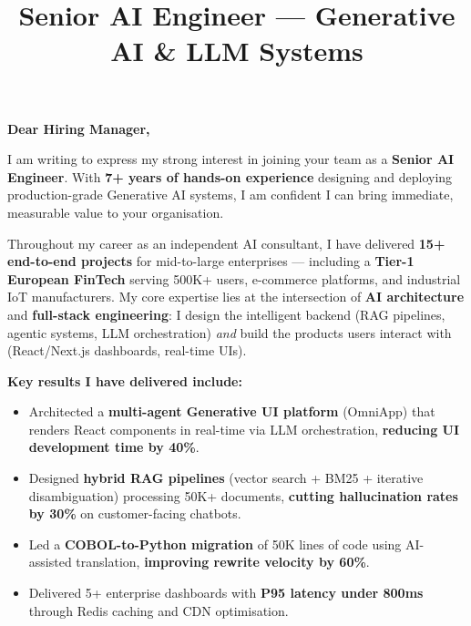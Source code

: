 \documentclass[11pt,a4paper,sans]{moderncv}
\title{Senior AI Engineer --- Generative AI \& LLM Systems}
\begin{document}
\makecvtitle

\vspace{-1.5em}


\section{}

\textbf{Dear Hiring Manager,}
\vspace{0.8em}

I am writing to express my strong interest in joining your team as a \textbf{Senior AI Engineer}. With \textbf{7+ years of hands-on experience} designing and deploying production-grade Generative AI systems, I am confident I can bring immediate, measurable value to your organisation.

\vspace{0.5em}

Throughout my career as an independent AI consultant, I have delivered \textbf{15+ end-to-end projects} for mid-to-large enterprises --- including a \textbf{Tier-1 European FinTech} serving 500K+ users, e-commerce platforms, and industrial IoT manufacturers. My core expertise lies at the intersection of \textbf{AI architecture} and \textbf{full-stack engineering}: I design the intelligent backend (RAG pipelines, agentic systems, LLM orchestration) \textit{and} build the products users interact with (React/Next.js dashboards, real-time UIs).

\vspace{0.5em}

\textbf{Key results I have delivered include:}
\vspace{0.3em}
\begin{itemize}
    \item[\textbullet] Architected a \textbf{multi-agent Generative UI platform} (OmniApp) that renders React components in real-time via LLM orchestration, \textbf{reducing UI development time by 40\%}.
    \item[\textbullet] Designed \textbf{hybrid RAG pipelines} (vector search + BM25 + iterative disambiguation) processing 50K+ documents, \textbf{cutting hallucination rates by 30\%} on customer-facing chatbots.
    \item[\textbullet] Led a \textbf{COBOL-to-Python migration} of \texttildelow50K lines of code using AI-assisted translation, \textbf{improving rewrite velocity by 60\%}.
    \item[\textbullet] Delivered 5+ enterprise dashboards with \textbf{P95 latency under 800ms} through Redis caching and CDN optimisation.
\end{itemize}
\end{document}

